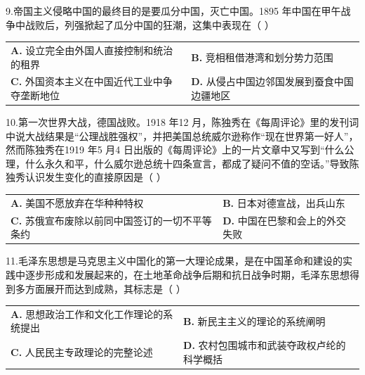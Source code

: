 \documentclass[UTF8,11pt]{ctexart}
\begin{document}
9.帝国主义侵略中国的最终目的是要瓜分中国，灭亡中国。1895 年中国在甲午战争中战败后，列强掀起了瓜分中国的狂潮，这集中表现在（  ）


\begin{center}\begin{tabular}{>{\raggedright\arraybackslash}p{\dimexpr(\linewidth-4\tabcolsep)/2\relax}>{\raggedright\arraybackslash}p{\dimexpr(\linewidth-4\tabcolsep)/2\relax}}
\textbf{A.} 设立完全由外国人直接控制和统治的租界 & \textbf{B.} 竞相租借港湾和划分势力范围\\[.35em]
\textbf{C.} 外国资本主义在中国近代工业中争夺垄断地位 & \textbf{D.} 从侵占中国边邻国发展到蚕食中国边疆地区\\[.35em]\end{tabular}\end{center}

10.第一次世界大战，德国战败。1918 年12 月，陈独秀在《每周评论》里的发刊词中说大战结果是“公理战胜强权”，并把美国总统威尔逊称作“现在世界第一好人”，然而陈独秀在1919 年5 月4 日出版的《每周评论》上的一片文章中又写到“什么公理，什么永久和平，什么威尔逊总统十四条宣言，都成了疑问不值的空话。”导致陈独秀认识发生变化的直接原因是（  ）


\begin{center}\begin{tabular}{>{\raggedright\arraybackslash}p{\dimexpr(\linewidth-4\tabcolsep)/2\relax}>{\raggedright\arraybackslash}p{\dimexpr(\linewidth-4\tabcolsep)/2\relax}}
\textbf{A.} 美国不愿放弃在华种种特权 & \textbf{B.} 日本对德宣战，出兵山东\\[.35em]
\textbf{C.} 苏俄宣布废除以前同中国签订的一切不平等条约 & \textbf{D.} 中国在巴黎和会上的外交失败\\[.35em]\end{tabular}\end{center}

11.毛泽东思想是马克思主义中国化的第一大理论成果，是在中国革命和建设的实践中逐步形成和发展起来的，在土地革命战争后期和抗日战争时期，毛泽东思想得到多方面展开而达到成熟，其标志是（  ）


\begin{center}\begin{tabular}{>{\raggedright\arraybackslash}p{\dimexpr(\linewidth-4\tabcolsep)/2\relax}>{\raggedright\arraybackslash}p{\dimexpr(\linewidth-4\tabcolsep)/2\relax}}
\textbf{A.} 思想政治工作和文化工作理论的系统提出 & \textbf{B.} 新民主主义的理论的系统阐明\\[.35em]
\textbf{C.} 人民民主专政理论的完整论述 & \textbf{D.} 农村包围城市和武装夺政权卢纶的科学概括\\[.35em]\end{tabular}\end{center}
\end{document}
